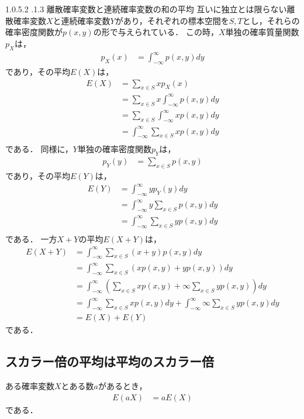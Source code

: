 \documentclass[dvipdfmx]{jsarticle}
\makeatletter
\newcommand{\subsubsubsection}{\@startsection{paragraph}{4}{\z@}%
 {1.0\Cvs \@plus.5\Cdp \@minus.2\Cdp}%
 {.1\Cvs \@plus.3\Cdp}%
 {\reset@font\sffamily\normalsize}
}
\makeatother
\begin{document}
 \subsubsubsection{離散確率変数と連続確率変数の和の平均}
互いに独立とは限らない離散確率変数$X$と連続確率変数$Y$があり，それぞれの標本空間を$S,T$とし，それらの確率密度関数が$p\left(x,y\right)$の形で与えられている．
この時，$X$単独の確率質量関数$p_X$は，
 \begin{align}
  p_X\left(x\right)&=\int_{-\infty}^\infty p\left(x,y\right)dy
 \end{align}
であり，その平均$E\left(X\right)$は，
 \begin{align}
  E\left(X\right)&=\sum_{x\in S}xp_X\left(x\right)\nonumber\\
  &=\sum_{x\in S}x\int_{-\infty}^\infty p\left(x,y\right)dy\nonumber\\
  &=\sum_{x\in S}\int_{-\infty}^\infty xp\left(x,y\right)dy\nonumber\\
  &=\int_{-\infty}^\infty\sum_{x\in S}xp\left(x,y\right)dy\nonumber\\
 \end{align}
である．
同様に，$Y$単独の確率密度関数$p_Y$は，
 \begin{align}
  p_Y\left(y\right)&=\sum_{x\in S}p\left(x,y\right)
 \end{align}
であり，その平均$E\left(Y\right)$は，
 \begin{align}
  E\left(Y\right)&=\int_{-\infty}^\infty yp_Y\left(y\right)dy\nonumber\\
  &=\int_{-\infty}^\infty y\sum_{x\in S}p\left(x,y\right)dy\nonumber\\
  &=\int_{-\infty}^\infty\sum_{x\in S}yp\left(x,y\right)dy\nonumber\\
 \end{align}
である．
一方$X+Y$の平均$E\left(X+Y\right)$は，
 \begin{align}
  E\left(X+Y\right)&=\int_{-\infty}^\infty\sum_{x\in S}\left(x+y\right)p\left(x,y\right)dy\nonumber\\
  &=\int_{-\infty}^\infty\sum_{x\in S}\left(xp\left(x,y\right)+yp\left(x,y\right)\right)dy\nonumber\\
  &=\int_{-\infty}^\infty\left(\sum_{x\in S}xp\left(x,y\right)+\infty\sum_{x\in S}yp\left(x,y\right)\right)dy\nonumber\\
  &=\int_{-\infty}^\infty\sum_{x\in S}xp\left(x,y\right)dy+\int_{-\infty}^\infty\infty\sum_{x\in S}yp\left(x,y\right)dy\nonumber\\
  &=E\left(X\right)+E\left(Y\right)
 \end{align}
である．
 \subsection{スカラー倍の平均は平均のスカラー倍}
ある確率変数$X$とある数$a$があるとき，
 \begin{align}
  E\left(aX\right)&=aE\left(X\right)
 \end{align}
である．
\end{document}
